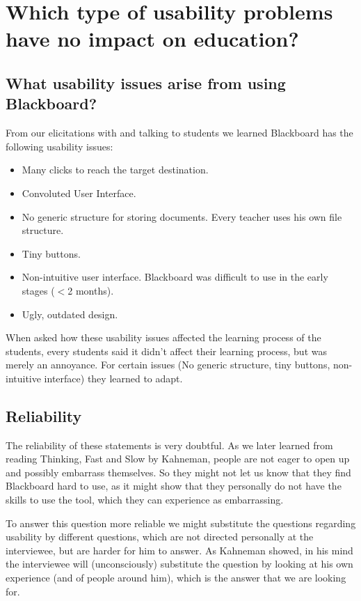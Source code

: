 \section{Which type of usability problems have no impact on education?}

\subsection{What usability issues arise from using Blackboard?}
From our elicitations with and talking to students we learned Blackboard has the following usability issues:
\begin{itemize}
	\item Many clicks to reach the target destination.
	\item Convoluted User Interface.
	\item No generic structure for storing documents. Every teacher uses his own file structure.
	\item Tiny buttons.
	\item Non-intuitive user interface. Blackboard was difficult to use in the early stages ($<$2 months).
	\item Ugly, outdated design.
\end{itemize}

When asked how these usability issues affected the learning process of the students, every students said it didn't affect their learning process, but was merely an annoyance. For certain issues (No generic structure, tiny buttons, non-intuitive interface) they learned to adapt.

\subsection{Reliability}
The reliability of these statements is very doubtful. As we later learned from reading Thinking, Fast and Slow by Kahneman, people are not eager to open up and possibly embarrass themselves. So they might not let us know that they find Blackboard hard to use, as it might show that they personally do not have the skills to use the tool, which they can experience as embarrassing.

To answer this question more reliable we might substitute the questions regarding usability by different questions, which are not directed personally at the interviewee, but are harder for him to answer. As Kahneman showed, in his mind the interviewee will (unconsciously) substitute the question by looking at his own experience (and of people around him), which is the answer that we are looking for. 


